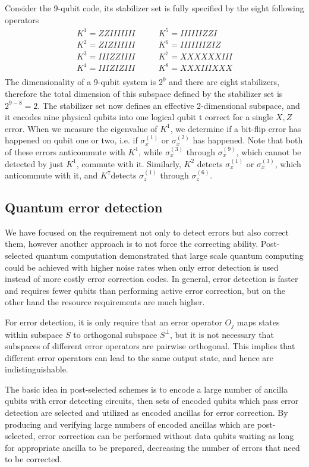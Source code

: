 \documentclass[10pt,a4paper]{book}
\numberwithin{equation}{chapter}
\numberwithin{figure}{chapter}
\numberwithin{table}{chapter}
\begin{document}
Consider the 9-qubit code, its stabilizer set is fully specified by the eight following operators
\begin{align*}
K^1 = ZZIIIIIII \quad &\quad K^5 = IIIIII ZZI \\
K^2= Z I Z IIIIII \quad &\quad K^6 = IIIIIII Z I Z \\
K^3 = III ZZ IIII \quad &\quad K^7 = XXXXXXIII \\
K^4 = III Z I Z III \quad &\quad K^8 = XXX III XXX \\
\end{align*}
The dimensionality of a 9-qubit system is $2^9$ and there are eight stabilizers, therefore the total dimension of this subspace defined by the stabilizer set is $2^{9-8}=2$. The stabilizer set now defines an effective 2-dimensional subspace, and it encodes nine physical qubits into one logical qubit t correct for a single $X,Z$ error. When we measure the eigenvalue of $K^1$, we determine if a bit-flip error has happened on qubit one or two, i.e. if $\sigma^{(1)}_x$ or $\sigma^{(2)}_x$ has happened. Note that both of these errors anticommute with $K^1$, while $\sigma^{(3)}_x$ through $\sigma^{(9)}_x$, which cannot be detected by just $K^1$, commute with it. Similarly, $K^2$ detects $\sigma^{(1)}_x$ or $\sigma^{(3)}_x$, which anticommute with it, and $K^7 $detects $\sigma^{(1)}_z$ through $\sigma^{(6)}_z$. 


\subsection{Quantum error detection}
We have focused on the requirement not only to detect errors but also correct them, however another approach is to not force the correcting ability. Post-selected quantum computation \cite{Kni05} demonstrated that large scale quantum computing could be achieved with higher noise rates when only error detection is used instead of more costly error correction codes. In general, error detection is faster and requires fewer qubits than performing active error correction, but on the other hand the resource requirements are much higher.

For error detection, it is only require that an error operator $O_j$ maps states within subspace $S$ to orthogonal subspace $S^\bot$, but it is not necessary that subspaces of different error operators
are pairwise orthogonal. This implies that different error operators can lead to the same output state, and hence are indistinguishable.

The basic idea in post-selected schemes is to encode a large number of ancilla qubits with error detecting circuits, then  sets of encoded qubits which pass error detection are selected and utilized as encoded ancillas for error correction. By producing and verifying large numbers of encoded ancillas which are post-selected, error correction can be performed without data qubits waiting as long for appropriate ancilla to be prepared, decreasing the number of errors that need to be corrected.
\end{document}
